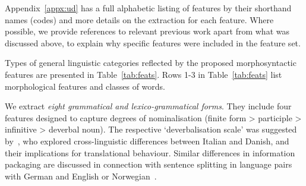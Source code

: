 Appendix~\ref{appx:ud} has a full alphabetic listing of features by their shorthand names (codes) and more details on the extraction for each feature. Where possible, we provide references to relevant previous work apart from what was discussed above, to explain why specific features were included in the feature set. 

Types of general linguistic categories reflected by the proposed morphosyntactic features are presented in Table~\ref{tab:feats}. Rows 1-3 in Table~\ref{tab:feats} list morphological features and classes of words.

We extract \textit{eight grammatical and lexico-grammatical forms}. They include four features designed to capture degrees of nominalisation (finite form > participle > infinitive > deverbal noun). The respective `deverbalisation scale' was suggested by~\cite{Korzen2011}, who explored cross-linguistic differences between Italian and Danish, and their implications for translational behaviour. Similar differences in information packaging are discussed in connection with sentence splitting in language pairs with German and English or Norwegian~\cite{FabriciusHansen1999}. 

